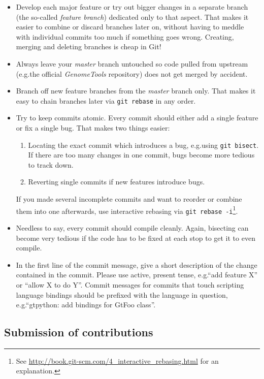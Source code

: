 \documentclass[11pt,final]{article}
\newcommand{\keyword}[1]{\lstinline{#1}}
\newcommand{\Gt}[0]{\emph{GenomeTools}\xspace}
\begin{document}
\begin{itemize}
\item
Develop each major feature or try out bigger changes in a separate branch
(the so-called \emph{feature branch})
dedicated only to that aspect. That makes it easier to combine or discard
branches later on, without having to meddle with individual commits too much
if something goes wrong. Creating, merging and deleting branches is cheap in
Git!
\item
Always leave your \emph{master} branch untouched so code pulled from upstream
(e.g.\@ the official \Gt repository) does not get merged by accident.
\item
Branch off new feature branches from the \emph{master} branch only. That makes
it easy to chain branches later via \keyword{git rebase} in any order.
\item
Try to keep commits atomic. Every commit should either add a single feature or
fix a single bug. That makes two things easier:
\begin{enumerate}
  \item
  Locating the exact commit which introduces a bug, e.g.\@ using
  \keyword{git bisect}. If there are too many changes in one commit, bugs
  become more tedious to track down.
  \item
  Reverting single commits if new features introduce bugs.
\end{enumerate}
If you made several incomplete commits and want to reorder or combine them into
one afterwards, use interactive rebasing via \keyword{git rebase
-i}\footnote{See \url{http://book.git-scm.com/4_interactive_rebasing.html} for
an explanation.}.
\item
Needless to say, every commit should compile cleanly. Again, bisecting can become
very tedious if the code has to be fixed at each stop to get it to even compile.
\item
In the first line of the commit message, give a short description of the
change contained in the commit.  Please use active, present tense,
e.g.\@ ``add feature X'' or ``allow X to do Y''.
Commit messages for commits that touch scripting
language bindings should be prefixed with the language in question,
e.g.\@ ``gtpython: add bindings for GtFoo class''.
\end{itemize}

\subsection{Submission of contributions}
\end{document}
